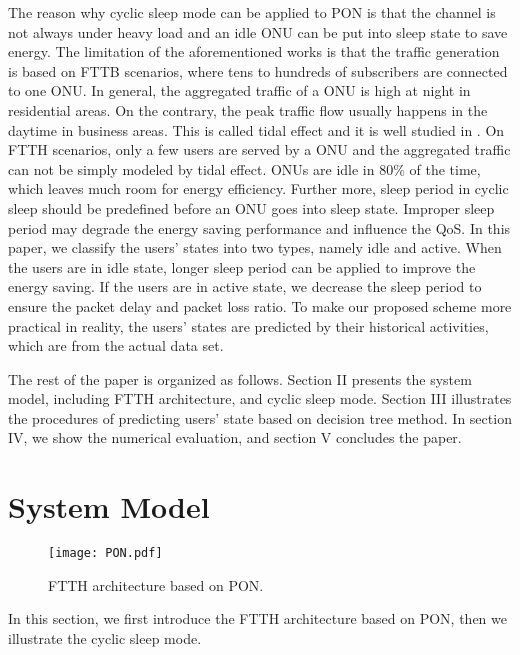 \documentclass[journal]{IEEEtran}
\begin{document}
The reason why cyclic sleep mode can be applied to PON is that the channel is not always under heavy load and an idle ONU can be put into sleep state to save energy. The limitation of the aforementioned works is that the traffic generation is based on FTTB scenarios, where tens to hundreds of subscribers are connected to one ONU. In general, the aggregated traffic of a ONU is high at night in residential areas. On the contrary, the peak traffic flow usually happens in the daytime in business areas. This is called tidal effect and it is well studied in \cite{7444562, 6848766}. On FTTH scenarios, only a few users are served by a ONU and the aggregated traffic can not be simply modeled by tidal effect. ONUs are idle in 80\% of the time, which leaves much room for energy efficiency. Further more, sleep period in cyclic sleep should be predefined before an ONU goes into sleep state. Improper sleep period may degrade the energy saving performance and influence the QoS. In this paper, we classify the users' states into two types, namely idle and active. When the users are in idle state, longer sleep period can be applied to improve the energy saving. If the users are in active state, we decrease the sleep period to ensure the packet delay and packet loss ratio. To make our proposed scheme more practical in reality, the users' states are predicted by their historical activities, which are from the actual data set.

The rest of the paper is organized as follows. Section II presents the system model, including FTTH architecture, and cyclic sleep mode. Section III illustrates the procedures of predicting users' state based on decision tree method. In section IV, we show the numerical evaluation, and section V concludes the paper.


\section{System Model}

\begin{figure}[t]
    \centering 
        \texttt{[image: PON.pdf]}\\ 
    \caption{ FTTH architecture based on PON.}
    \label{PON}
\end{figure}

In this section, we first introduce the FTTH architecture based on PON, then we illustrate the cyclic sleep mode.
\end{document}

